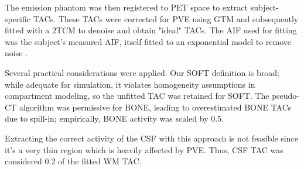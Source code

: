 The emission phantom was then registered to PET space to extract subject-specific TACs.
These TACs were corrected for PVE using GTM and subsequently fitted with a 2TCM to denoise and obtain "ideal" TACs.
The AIF used for fitting was the subject’s measured AIF, itself fitted to an exponential model to remove noise \cite{feng1993models}.

Several practical considerations were applied.
Our SOFT definition is broad; while adequate for simulation, it violates homogeneity assumptions in compartment modeling, so the unfitted TAC was retained for SOFT.
The pseudo-CT algorithm was permissive for BONE, leading to overestimated BONE TACs due to spill-in; empirically, BONE activity was scaled by 0.5.

Extracting the correct activity of the CSF with this approach is not feasible since it's a very thin region which is heavily affected by PVE. Thus, CSF TAC was considered 0.2 of the fitted WM TAC.
